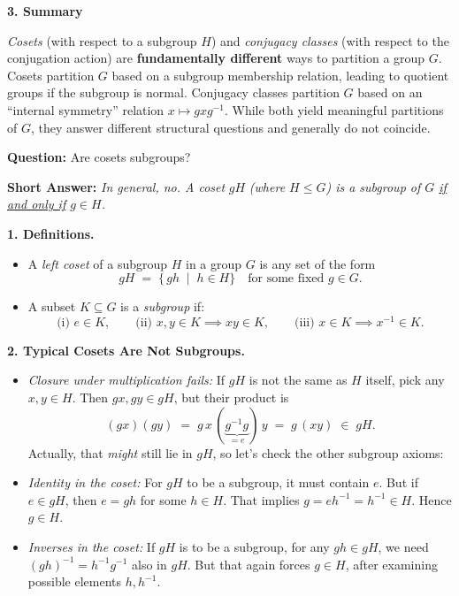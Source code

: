\documentclass[12pt]{article}
\theoremstyle{definition} %
\theoremstyle{plain} %
\begin{document}
\bigskip

\noindent
\textbf{3. Summary}

\noindent
\emph{Cosets} (with respect to a subgroup $H$) and \emph{conjugacy classes} (with respect to the conjugation action) are \textbf{fundamentally different} ways to partition a group $G$.  Cosets partition $G$ based on a subgroup membership relation, leading to quotient groups if the subgroup is normal.  Conjugacy classes partition $G$ based on an “internal symmetry” relation $x \mapsto gxg^{-1}$.  While both yield meaningful partitions of $G$, they answer different structural questions and generally do not coincide.

\noindent
\textbf{Question:} Are cosets subgroups?

\bigskip

\noindent
\textbf{Short Answer:} 
\emph{In general, no. A coset }$gH$\emph{ (where $H \le G$) is a subgroup of $G$ \underline{if and only if} $g \in H$.}

\bigskip

\noindent
\textbf{1. Definitions.}
\begin{itemize}
    \item A \emph{left coset} of a subgroup $H$ in a group $G$ is any set of the form
    \[
      gH \;=\;\{\,g h \;\mid\; h \in H\}
      \quad\text{for some fixed }g\in G.
    \]
    \item A subset $K \subseteq G$ is a \emph{subgroup} if:
    \[
      \text{(i) } e \in K,
      \quad\quad
      \text{(ii) }x, y \in K \implies xy \in K,
      \quad\quad
      \text{(iii) }x \in K \implies x^{-1} \in K.
    \]
\end{itemize}

\bigskip

\noindent
\textbf{2. Typical Cosets Are Not Subgroups.}
\begin{itemize}
    \item \emph{Closure under multiplication fails:} 
    If $gH$ is not the same as $H$ itself, pick any $x, y \in H$. Then $gx, gy \in gH$, but their product is
    \[
      (gx)(gy) \;=\; g\,x\,(\underbrace{g^{-1}g}_{=e})\,y \;=\; g\,(x y) \;\in\; gH.
    \]
    Actually, that \emph{might} still lie in $gH$, so let’s check the other subgroup axioms:
    \item \emph{Identity in the coset:} 
    For $gH$ to be a subgroup, it must contain $e$. But if $e \in gH$, then $e = gh$ for some $h \in H$. That implies $g = eh^{-1} = h^{-1} \in H$. Hence $g \in H$.
    \item \emph{Inverses in the coset:} 
    If $gH$ is to be a subgroup, for any $gh \in gH$, we need $(gh)^{-1} = h^{-1}g^{-1}$ also in $gH$. But that again forces $g \in H$, after examining possible elements $h, h^{-1}$.
\end{itemize}
\end{document}
